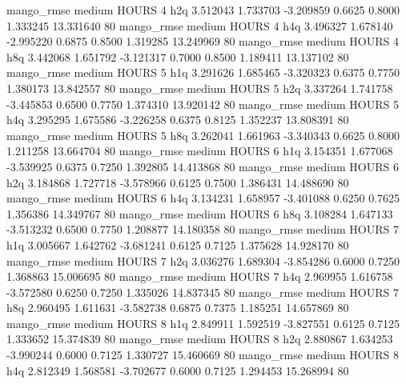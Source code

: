        mango_rmse     medium    HOURS                 4                  h2q  3.512043 1.733703 -3.209859 0.6625 0.8000  1.333245   13.331640 80
       mango_rmse     medium    HOURS                 4                  h4q  3.496327 1.678140 -2.995220 0.6875 0.8500  1.319285   13.249969 80
       mango_rmse     medium    HOURS                 4                  h8q  3.442068 1.651792 -3.121317 0.7000 0.8500  1.189411   13.137102 80
       mango_rmse     medium    HOURS                 5                  h1q  3.291626 1.685465 -3.320323 0.6375 0.7750  1.380173   13.842557 80
       mango_rmse     medium    HOURS                 5                  h2q  3.337264 1.741758 -3.445853 0.6500 0.7750  1.374310   13.920142 80
       mango_rmse     medium    HOURS                 5                  h4q  3.295295 1.675586 -3.226258 0.6375 0.8125  1.352237   13.808391 80
       mango_rmse     medium    HOURS                 5                  h8q  3.262041 1.661963 -3.340343 0.6625 0.8000  1.211258   13.664704 80
       mango_rmse     medium    HOURS                 6                  h1q  3.154351 1.677068 -3.539925 0.6375 0.7250  1.392805   14.413868 80
       mango_rmse     medium    HOURS                 6                  h2q  3.184868 1.727718 -3.578966 0.6125 0.7500  1.386431   14.488690 80
       mango_rmse     medium    HOURS                 6                  h4q  3.134231 1.658957 -3.401088 0.6250 0.7625  1.356386   14.349767 80
       mango_rmse     medium    HOURS                 6                  h8q  3.108284 1.647133 -3.513232 0.6500 0.7750  1.208877   14.180358 80
       mango_rmse     medium    HOURS                 7                  h1q  3.005667 1.642762 -3.681241 0.6125 0.7125  1.375628   14.928170 80
       mango_rmse     medium    HOURS                 7                  h2q  3.036276 1.689304 -3.854286 0.6000 0.7250  1.368863   15.006695 80
       mango_rmse     medium    HOURS                 7                  h4q  2.969955 1.616758 -3.572580 0.6250 0.7250  1.335026   14.837345 80
       mango_rmse     medium    HOURS                 7                  h8q  2.960495 1.611631 -3.582738 0.6875 0.7375  1.185251   14.657869 80
       mango_rmse     medium    HOURS                 8                  h1q  2.849911 1.592519 -3.827551 0.6125 0.7125  1.333652   15.374839 80
       mango_rmse     medium    HOURS                 8                  h2q  2.880867 1.634253 -3.990244 0.6000 0.7125  1.330727   15.460669 80
       mango_rmse     medium    HOURS                 8                  h4q  2.812349 1.568581 -3.702677 0.6000 0.7125  1.294453   15.268994 80
